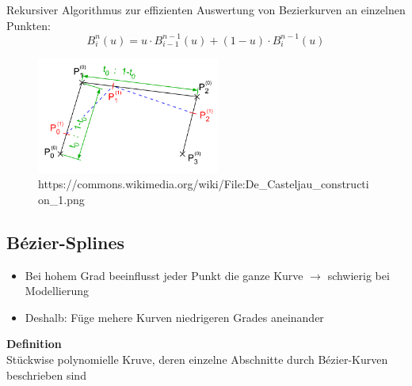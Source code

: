 \documentclass[10pt,a4paper]{article}
\begin{document}
        Rekursiver Algorithmus zur effizienten Auswertung von Bezierkurven an einzelnen Punkten:
        $$B_i^n(u) = u \cdot B_{i-1}^{n-1} (u) + (1 - u) \cdot B_i^{n-1}(u)$$\vspace*{-0.5cm}
		\begin{figure}[h]
    		\centering
    		\includegraphics[width=6cm]{images/De_Casteljau_construction_1}
	    	\caption{https://commons.wikimedia.org/wiki/File:De\_Casteljau\_construction\_1.png}
        \end{figure}

        \subsection{Bézier-Splines}
        \label{kuf:sub:bezier-splines}
        
        \begin{itemize}
        	\item Bei hohem Grad beeinflusst jeder Punkt die ganze Kurve $\rightarrow$ schwierig bei Modellierung
        	\item Deshalb: Füge mehere Kurven niedrigeren Grades aneinander
        \end{itemize}
        \textbf{Definition}\\
        Stückwise polynomielle Kruve, deren einzelne Abschnitte durch Bézier-Kurven beschrieben sind
        
\end{document}

